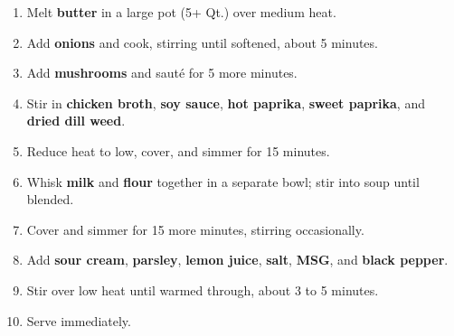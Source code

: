 \documentclass[11pt,letterpaper]{article}
\begin{document}
\begin{enumerate}
    \item Melt \textbf{butter} in a large pot (5+ Qt.) over medium heat.
    \item Add \textbf{onions} and cook, stirring until softened, about 5 minutes.
    \item Add \textbf{mushrooms} and sauté for 5 more minutes.
    \item Stir in \textbf{chicken broth}, \textbf{soy sauce}, \textbf{hot paprika}, \textbf{sweet paprika}, and \textbf{dried dill weed}.
    \item Reduce heat to low, cover, and simmer for 15 minutes.
    \item Whisk \textbf{milk} and \textbf{flour} together in a separate bowl; stir into soup until blended.
    \item Cover and simmer for 15 more minutes, stirring occasionally.
    \item Add \textbf{sour cream}, \textbf{parsley}, \textbf{lemon juice}, \textbf{salt}, \textbf{MSG}, and \textbf{black pepper}.
    \item Stir over low heat until warmed through, about 3 to 5 minutes.
    \item Serve immediately.
\end{enumerate}
\end{document}
